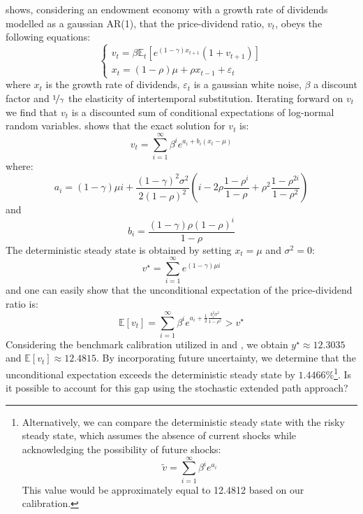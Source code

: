 \documentclass[a4paper,11pt]{amsart}
\begin{document}
\textcite{Burnside1998} shows, considering an endowment economy with
a growth rate of dividends modelled as a gaussian AR(1), that the
price-dividend ratio, $v_t$, obeys the following equations:
\[
   \begin{cases}
      v_t = \beta \mathbb E_t\left[ e^{(1-\gamma)x_{t+1}}\left(1+v_{t+1}\right) \right] \\
      x_t = (1-\rho)\mu + \rho x_{t-1} + \varepsilon_t
   \end{cases}
\]
where $x_t$ is the growth rate of dividends, $\varepsilon_t$ is a
gaussian white noise, $\beta$ a discount factor
and $\nicefrac{1}{\gamma}$ the elasticity of intertemporal
substitution.  Iterating forward on $v_t$ we find that $v_t$ is a
discounted sum of conditional expectations of log-normal random
variables. \textcite{Burnside1998} shows that the exact solution
for $v_t$ is:
\[
   v_t = \sum_{i=1}^\infty \beta^i e^{a_i + b_i (x_t-\mu)}
\]
where:
\[
   a_i = (1-\gamma)\mu i + \frac{(1-\gamma)^2\sigma^2}{2(1-\rho)^2}\left( i - 2\rho\frac{1-\rho^i}{1-\rho} + \rho^2\frac{1-\rho^{2i}}{1-\rho^2} \right)
\]
and
\[
   b_i = \frac{(1-\gamma)\rho\left( 1-\rho \right)^i}{1-\rho}
\]
The deterministic steady state is obtained by setting $x_t=\mu$ and $\sigma^2=0$:
\[
   v^{\star} = \sum_{i=1}^\infty e^{(1-\gamma)\mu i}
\]
and one can easily show that the unconditional expectation of the price-dividend ratio is:
\[
   \mathbb E\left[v_t\right] = \sum_{i=1}^\infty \beta^ie^{a_i + \frac{1}{2}\frac{b_i^2\sigma^2}{1-\rho^2}} > v^{\star}
\]
Considering the benchmark calibration utilized in
\textcite{CollardJuillard2001} and \textcite{Burnside1998}, we
obtain $y^{\star} \approx 12.3035$
and $\mathbb{E}\left[v_t \right] \approx 12.4815$. By incorporating future
uncertainty, we determine that the unconditional expectation exceeds
the deterministic steady state by $1.4466\%$\footnote{Alternatively,
   we can compare the deterministic steady state with the risky steady
   state, which assumes the absence of current shocks while
   acknowledging the possibility of future shocks:
   \[
      \tilde v = \sum_{i=1}^\infty \beta^i e^{a_i}
   \]
   This value would be approximately equal to 12.4812 based on our
   calibration.}. Is it possible to account for this gap using the
stochastic extended path approach?\newline
\end{document}
